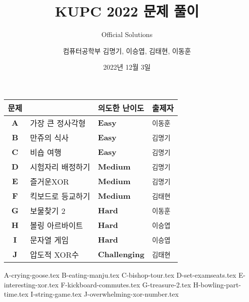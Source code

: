 
\usetikzlibrary{arrows.meta,matrix,decorations.pathreplacing}

\title{KUPC 2022 문제 풀이}
\subtitle{Official Solutions}
\author{컴퓨터공학부 김명기, 이승엽, 김태현, 이동훈}
\date{2022년 12월 3일}


    \setcounter{framenumber}{-1}
    \frame{\titlepage}
        
    \begin{frame} %
        \begin{center}
            \begin{tabular}{cl|l|l}
                \hline
                문제 & & 의도한 난이도 & 출제자 \\
                \hline
                \hline

				\textbf{A} & 가장 큰 정사각형 & \textbf{\color{acbronze}Easy} & \texttt{이동훈} \\
                \textbf{B} & 만쥬의 식사& \textbf{\color{acbronze}Easy} & \texttt{김명기} \\
                \textbf{C} & 비숍 여행 & \textbf{\color{acbronze}Easy} & \texttt{김명기} \\
                \textbf{D} & 시험자리 배정하기 & \textbf{\color{acsilver}Medium} & \texttt{김명기} \\
                \textbf{E} & 즐거운XOR & \textbf{\color{acsilver}Medium} & \texttt{김명기} \\
                \textbf{F} & 킥보드로 등교하기 & \textbf{\color{acsilver}Medium} & \texttt{김태현} \\
                \textbf{G} & 보물찾기 2 & \textbf{\color{acgold}Hard} & \texttt{이동훈} \\
                \textbf{H} & 볼링 아르바이트 & \textbf{\color{acgold}Hard} & \texttt{이승엽} \\
                \textbf{I} & 문자열 게임 & \textbf{\color{acgold}Hard} & \texttt{이승엽} \\
                \textbf{J} & 압도적 XOR수 & \textbf{\color{acgold}Challenging} & \texttt{김태현} \\

                \hline
            \end{tabular}
        \end{center}
    \end{frame}
    {A-crying-goose.tex}
    {B-eating-manju.tex}
    {C-bishop-tour.tex}
    {D-set-examseats.tex}
    {E-interesting-xor.tex}
    {F-kickboard-commutes.tex}
    {G-treasure-2.tex}
    {H-bowling-part-time.tex}
    {I-string-game.tex}
    {J-overwhelming-xor-number.tex}


